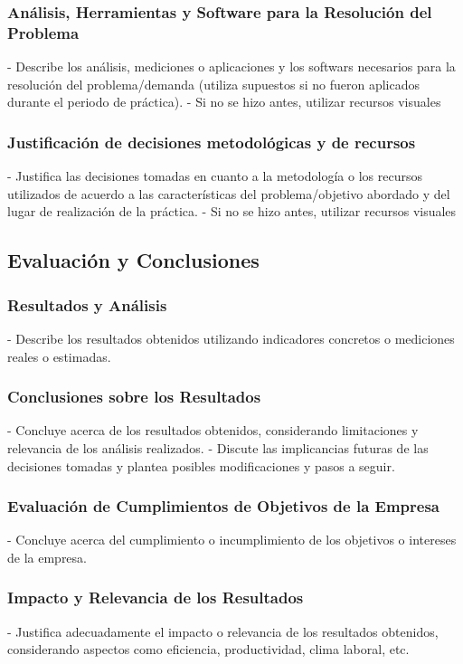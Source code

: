 \subsubsection{Análisis, Herramientas y Software para la Resolución del Problema}
    - Describe los análisis, mediciones o aplicaciones y los softwars necesarios para la resolución del problema/demanda (utiliza supuestos si no fueron aplicados durante el periodo de práctica).
    - Si no se hizo antes, utilizar recursos visuales


\subsubsection{Justificación de decisiones metodológicas y de recursos}
    - Justifica las decisiones tomadas en cuanto a la metodología o los recursos utilizados de acuerdo a las características del problema/objetivo abordado y del lugar de realización de la práctica.
    - Si no se hizo antes, utilizar recursos visuales



\subsection{Evaluación y Conclusiones}

\subsubsection{Resultados y Análisis}
    - Describe los resultados obtenidos utilizando indicadores concretos o mediciones reales o estimadas.

\subsubsection{Conclusiones sobre los Resultados}
    - Concluye acerca de los resultados obtenidos, considerando limitaciones y relevancia de los análisis realizados.
    - Discute las implicancias futuras de las decisiones tomadas y plantea posibles modificaciones y pasos a seguir.

\subsubsection{Evaluación de Cumplimientos de Objetivos de la Empresa}
    - Concluye acerca del cumplimiento o incumplimiento de los objetivos o intereses de la empresa.

\subsubsection{Impacto y Relevancia de los Resultados}
    - Justifica adecuadamente el impacto o relevancia de los resultados obtenidos, considerando aspectos como eficiencia, productividad, clima laboral, etc.

